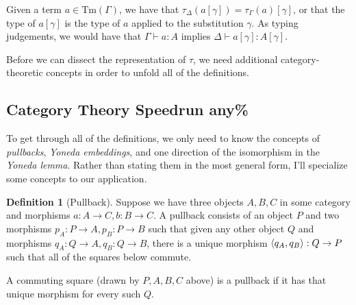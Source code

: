 \documentclass{article}
\renewcommand{\_}{\textrm{\textscale{.5}{\textunderscore}}}
\DeclarePairedDelimiter{\ctxt}{\langle}{\rangle}
\newcommand{\Tm}{\mathrm{Tm}}
\theoremstyle{definition}
\newtheorem{definition}{Definition}[section]
\theoremstyle{plain}
\begin{document}
Given a term $a \in \Tm(\Gamma)$, we have that $\tau_\Delta(a[\gamma]) = \tau_\Gamma(a)[\gamma]$,
or that the type of $a[\gamma]$ is the type of $a$ applied to the substitution $\gamma$.
As typing judgements, we would have that $\Gamma \vdash a : A$ implies $\Delta \vdash a[\gamma] : A[\gamma]$.

Before we can dissect the representation of $\tau$,
we need additional category-theoretic concepts in order to unfold all of the definitions.

\subsection{Category Theory Speedrun any\%}

To get through all of the definitions, we only need to know the concepts of \emph{pullbacks},
\emph{Yoneda embeddings}, and one direction of the isomorphism in the \emph{Yoneda lemma}.
Rather than stating them in the most general form, I'll specialize some concepts to our application.

\begin{definition}[Pullback]
Suppose we have three objects $A, B, C$ in some category and morphisms $a : A \to C, b : B \to C$.
A pullback consists of an object $P$ and two morphisms $p_A : P \to A, p_B : P \to B$
such that given any other object $Q$ and morphisms $q_A : Q \to A, q_B : Q \to B$,
there is a unique morphism $\ctxt{q_A, q_B} : Q \to P$
such that all of the squares below commute.
\begin{center}
\end{center}
A commuting square (drawn by $P, A, B, C$ above) is a pullback if it has that unique morphism for every such $Q$.
\end{definition}
\end{document}
